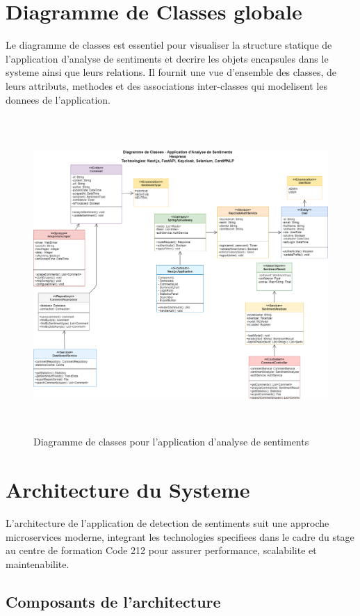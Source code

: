 \section{Diagramme de Classes globale}

Le diagramme de classes est essentiel pour visualiser la structure statique de l'application d'analyse de sentiments et decrire les objets encapsules dans le systeme ainsi que leurs relations. Il fournit une vue d'ensemble des classes, de leurs attributs, methodes et des associations inter-classes qui modelisent les donnees de l'application.

\begin{figure}[H]
\centering
\includegraphics[height=12cm , width=\textwidth]{assets/images/class.png}
\caption{Diagramme de classes pour l'application d'analyse de sentiments}
\label{fig:class-global}
\end{figure}

\section{Architecture du Systeme}

L'architecture de l'application de detection de sentiments suit une approche microservices moderne, integrant les technologies specifiees dans le cadre du stage au centre de formation Code 212 pour assurer performance, scalabilite et maintenabilite.

\subsection{Composants de l'architecture}

